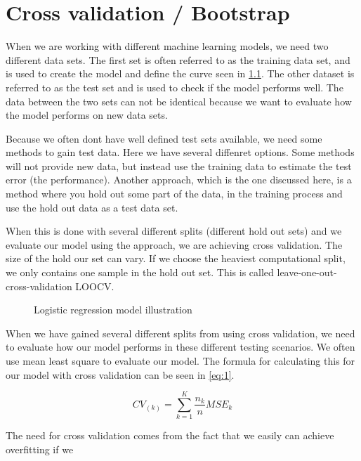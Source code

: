 \graphicspath{{Chapters/Indledning/}}

\chapter{Cross validation / Bootstrap}

When we are working with different machine learning models, we need two different data sets. The first set is often referred to as the training data set, and is used to create the model and define the curve seen in \ref{fig:logistic_regression}. The other dataset is referred to as the test set and is used to check if the model performs well. The data between the two sets can not be identical because we want to evaluate how the model performs on new data sets. 

Because we often dont have well defined test sets available, we need some methods to gain test data. Here we have several diffenret options. Some methods will not provide new data, but instead use the training data to estimate the test error (the performance). Another approach, which is the one discussed here, is a method where you hold out some part of the data, in the training process and use the hold out data as a test data set. 

When this is done with several different splits (different hold out sets) and we evaluate our model using the approach, we are achieving cross validation. The size of the hold our set can vary. If we choose the heaviest computational split, we only contains one sample in the hold out set. This is called leave-one-out-cross-validation LOOCV. 

\begin{figure}[H]
  \centering
  \caption{Logistic regression model illustration}
  \label{fig:logistic_regression}
\end{figure}

When we have gained several different splits from using cross validation, we need to evaluate how our model performs in these different testing scenarios. We often use mean least square to evaluate our model. The formula for calculating this for our model with cross validation can be seen in \ref{eq:1}.

\begin{equation} \label{eq:1}
CV_{(k)} = \sum_{k=1}^{K} \frac{n_k}{n} MSE_k
\end{equation}

The need for cross validation comes from the fact that we easily can achieve overfitting if we 

